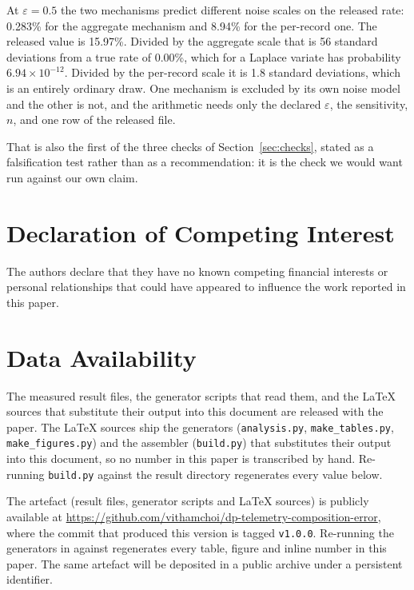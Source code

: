 \documentclass[journal]{IEEEtran}
\theoremstyle{definition}
\newcommand{\Truerate}{0.00}
\newcommand{\WorstEps}{0.5}
\newcommand{\LapAlarmExact}{$6.94\times 10^{-12}$}
\newcommand{\ZRelHalf}{15.97}
\newcommand{\ZSdAgg}{0.283}
\newcommand{\ZSdPer}{8.94}
\newcommand{\ZSigmaAgg}{56}
\newcommand{\ZSigmaPer}{1.8}
\begin{document}
At $\varepsilon=\WorstEps$ the two mechanisms predict different noise scales on
the released rate: \ZSdAgg\% for the aggregate mechanism and \ZSdPer\% for the
per-record one. The released value is \ZRelHalf\%. Divided by the aggregate
scale that is \ZSigmaAgg{} standard deviations from a true rate of \Truerate\%,
which for a Laplace variate has probability \LapAlarmExact. Divided by the
per-record scale it is \ZSigmaPer{} standard deviations, which is an entirely
ordinary draw. One mechanism is excluded by its own noise model and the other is
not, and the arithmetic needs only the declared $\varepsilon$, the sensitivity,
$n$, and one row of the released file.

That is also the first of the three checks of Section~\ref{sec:checks}, stated
as a falsification test rather than as a recommendation: it is the check we
would want run against our own claim.




\section*{Declaration of Competing Interest}

The authors declare that they have no known competing financial interests or
personal relationships that could have appeared to influence the work reported
in this paper.

\section*{Data Availability}

The measured result files, the generator scripts that read them, and the LaTeX
sources that substitute their output into this document are released with the
paper. The
LaTeX sources ship the generators (\texttt{analysis.py},
\texttt{make\_tables.py}, \texttt{make\_\allowbreak{}figures.\allowbreak{}py}) and the assembler
(\texttt{build.py}) that substitutes their output into this document, so no
number in this paper is transcribed by hand. Re-running \texttt{build.py} against
the result directory regenerates every value below.

The artefact (result files, generator scripts and \LaTeX{} sources) is publicly
available at \url{https://github.com/vithamchoi/dp-telemetry-composition-error}, where the commit that
produced this version is tagged \texttt{v1.0.0}. Re-running the generators in
 against  regenerates every table, figure and
inline number in this paper. The same artefact will be deposited in a public
archive under a persistent identifier.




\end{document}
